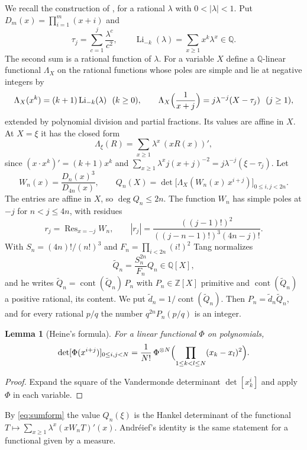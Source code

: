 \documentclass[11pt]{amsart}
\newtheorem{lemma}[theorem]{Lemma}
\theoremstyle{definition}
\theoremstyle{remark}
\numberwithin{equation}{section}
\newcommand{\Z}{\mathbb Z}
\newcommand{\Q}{\mathbb Q}
\newcommand{\Li}{\operatorname{Li}}
\newcommand{\cont}{\operatorname{cont}}
\begin{document}
We recall the construction of \cite{TangLi2}, for a rational $\lambda$ with $0<|\lambda|<1$. Put
$D_m(x)=\prod_{i=1}^m(x+i)$ and
\[
 \tau_j=\sum_{c=1}^j\frac{\lambda^c}{c^2},\qquad \Li_{-k}(\lambda)=\sum_{x\ge1}x^k\lambda^x\in\Q .
\]
The second sum is a rational function of $\lambda$. For a variable $X$ define a $\Q$-linear functional $\Lambda_X$ on
the rational functions whose poles are simple and lie at negative integers by
\begin{equation}\label{eq:functional}
 \Lambda_X(x^k)=(k+1)\Li_{-k}(\lambda)\ \ (k\ge0),\qquad \Lambda_X\Bigl(\frac1{x+j}\Bigr)=j\lambda^{-j}(X-\tau_j)\ \ (j\ge1),
\end{equation}
extended by polynomial division and partial fractions. Its values are affine in $X$. At $X=\xi$ it has the closed
form
\begin{equation}\label{eq:sumform}
 \Lambda_\xi(R)=\sum_{x\ge1}\lambda^x\,(xR(x))' ,
\end{equation}
since $(x\cdot x^k)'=(k+1)x^k$ and $\sum_{x\ge1}\lambda^x j(x+j)^{-2}=j\lambda^{-j}(\xi-\tau_j)$. Let
\[
 W_n(x)=\frac{D_n(x)^3}{D_{4n}(x)},\qquad Q_n(X)=\det\bigl[\Lambda_X(W_n(x)\,x^{i+j})\bigr]_{0\le i,j<2n}.
\]
The entries are affine in $X$, so $\deg Q_n\le2n$. The function $W_n$ has simple poles at $-j$ for $n<j\le4n$, with
residues
\begin{equation}\label{eq:residue}
 r_j=\operatorname{Res}_{x=-j}W_n,\qquad |r_j|=\frac{((j-1)!)^2}{((j-n-1)!)^3(4n-j)!}.
\end{equation}
With $S_n=(4n)!/(n!)^3$ and $F_n=\prod_{i<2n}(i!)^2$ Tang normalizes
\[
 \tilde Q_n=\frac{S_n^{2n}}{F_n}Q_n\in\Q[X],
\]
and he writes $\tilde Q_n=\cont(\tilde Q_n)\,P_n$ with $P_n\in\Z[X]$ primitive and $\cont(\tilde Q_n)$ a positive
rational, its content. We put $\tilde d_n=1/\cont(\tilde Q_n)$. Then $P_n=\tilde d_n\tilde Q_n$, and for every rational
$p/q$ the number $q^{2n}P_n(p/q)$ is an integer.

\begin{lemma}[Heine's formula]\label{lem:heine}
For a linear functional $\Phi$ on polynomials,
\[
 \det[\Phi(x^{i+j})]_{0\le i,j<N}=\frac1{N!}\,\Phi^{\otimes N}\Bigl(\prod_{1\le k<l\le N}(x_k-x_l)^2\Bigr).
\]
\end{lemma}

\begin{proof}
Expand the square of the Vandermonde determinant $\det[x_k^i]$ and apply $\Phi$ in each variable.
\end{proof}

By \eqref{eq:sumform} the value $Q_n(\xi)$ is the Hankel determinant of the functional
$T\mapsto\sum_{x\ge1}\lambda^x(xW_nT)'(x)$. Andr\'eief's identity \cite{Forrester2018Andreief} is the same
statement for a functional given by a measure.
\end{document}
